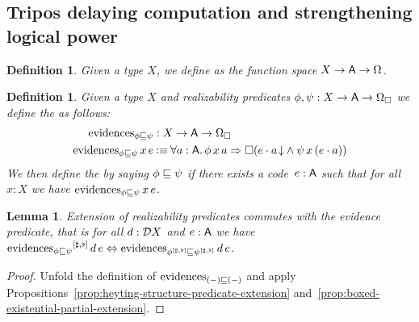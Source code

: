 \documentclass[11pt]{article}
\newtheorem{lemm}[thrm]{Lemma}
\newtheorem{defn}[thrm]{Definition}
\begin{document}
\subsection{Tripos delaying computation and strengthening logical power}%
\label{sub:vo-tripos}

\begin{defn}\label{defn:vo-tripos-predicates}
  Given a type \(X\), we define  as the function space \({{X}\to{{{\ensuremath{\mathsf{A}}}\to{\Omega}}}}\).
\end{defn}

\begin{defn}\label{defn:vo-tripos-ordering}
  Given a type \(X\) and realizability predicates \(\phi,\psi : {{X}\to{{{\ensuremath{\mathsf{A}}}\to{\Omega_\Box}}}}\)
  we define the  as
  follows:
  \begin{align*}
    \IEvidenceCl{\phi}{\psi}
    &: \IRealPredCl{X}
    \\
    {\IEvidenceCl{\phi}{\psi}\,x\,e}
    &\IsDefined
      \IForall%
      {a:\A}%
      {\IImplies%
      {\phi\,x\,a}%
      {\IBox{(\IAnd{\ITotal{\IAp{e}{a}}}{\psi\,x\,(\IAp{e}{a})})}}}
  \end{align*}
  We then define the 
  by saying \({\phi}\sqsubseteq{\psi}\) if there exists a code~\(e : \mathsf{A}\)
  such that for all \(x : X\) we have \(\text{evidences}_{{\phi}\sqsubseteq{\psi}}\,x\,e\).
\end{defn}

\begin{lemm}\label{prop:vo-extension-of-evidence-predicate}
  Extension of realizability predicates commutes with the evidence
  predicate, that is for all \(d:\mathcal{D}{X}\) and \(e:\mathsf{A}\) we have
  \(
    {\text{evidences}_{{\phi}\sqsubseteq{\psi}}}^{[{\sharp,\flat}]}\,d\,e
    \Leftrightarrow
    \text{evidences}_{{{\phi}^{[{\sharp,\flat}]}}\sqsubseteq{{\psi}^{[{\sharp,\flat}]}}}\,d\,e
  \).
\end{lemm}
\begin{proof}
  Unfold the definition of \(\text{evidences}_{{(-)}\sqsubseteq{(-)}}\) and apply
  Propositions~\ref{prop:heyting-structure-predicate-extension}
  and~\ref{prop:boxed-existential-partial-extension}.
\end{proof}
\end{document}
